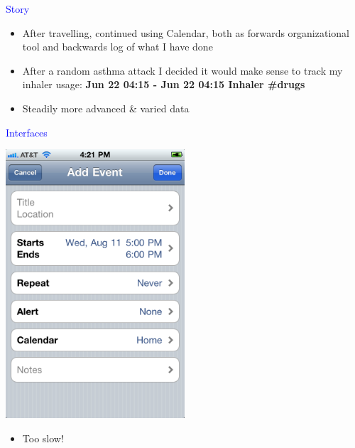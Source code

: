 \documentclass[landscape]{slides}
\begin{document}
\begin{slide}

    \textcolor{blue}{\Large{Story}}

    \begin{itemize}
        \item After travelling, continued using Calendar, both as forwards organizational tool and backwards log of what I have done
        \item After a random asthma attack I decided it would make sense to track my inhaler usage: \newline
        \textbf{Jun 22 04:15 - Jun 22 04:15 Inhaler \#drugs}
        \item Steadily more advanced \& varied data
    \end{itemize}

\end{slide}


\begin{slide}

    \textcolor{blue}{\Large{Interfaces}}

    \includegraphics[height=10cm]{ios-calendar-add}

    \begin{itemize}
        \item Too slow!
    \end{itemize}

\end{slide}
\end{document}
